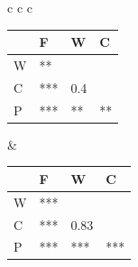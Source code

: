 \documentclass[man,longtable, floatmark]{my-apa6}
\begin{document}
\begin{ThreePartTableHere}
\begin{longtable}{c c c}
  { %
    \footnotesize
    \begin{tabular}{| l | l |  l | l |}
      \hline
      & F                           & W                         & C \\ \hline
      W &  **  &                           &\\ \hline
      C &  ***  &   0.4  &\\ \hline
      P &  *** &   **  &   **\\ \hline
    \end{tabular}
  } &

  { %
    \footnotesize
    \begin{tabular}{| l | l |  l | l |}
      \hline
      & F   & W    & C   \\ \hline
      W & *** &      &     \\ \hline
      C & *** & 0.83 &     \\ \hline
      P & *** & ***  & *** \\ \hline
    \end{tabular}
  }\\
  \insertTableNotes
\end{longtable}
\end{ThreePartTableHere}
\end{document}
